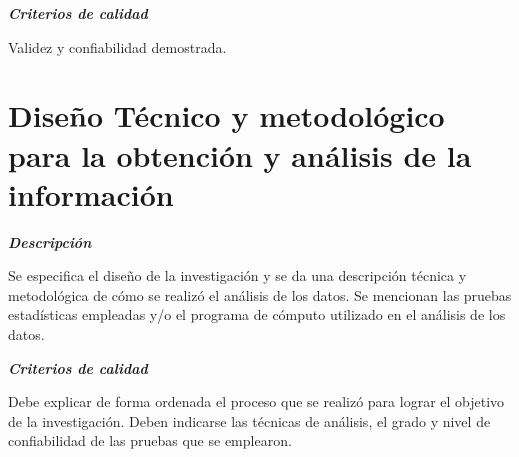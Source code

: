     \textbf{\textit{Criterios de calidad}}
    
    Validez y confiabilidad demostrada.

\section{Diseño Técnico y metodológico para la obtención y análisis de la información}

    \textbf{\textit{Descripción}}
    
    Se especifica el diseño de la investigación y se da una descripción técnica y metodológica de cómo se realizó el análisis de los datos.
    Se mencionan las pruebas estadísticas empleadas y/o el programa de cómputo utilizado en el análisis de los datos.
    
    \textbf{\textit{Criterios de calidad}}
    
    Debe explicar de forma ordenada el proceso que se realizó para lograr el objetivo de la investigación.
    Deben indicarse las técnicas de análisis, el grado y nivel de confiabilidad de las pruebas que se emplearon.